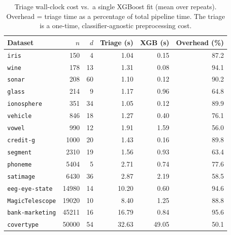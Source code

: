 \begin{table}[t]
\centering
\caption{Triage wall-clock cost vs.\ a single XGBoost fit (mean over repeats). Overhead = triage time as a percentage of total pipeline time. The triage is a one-time, classifier-agnostic preprocessing cost.}
\label{tab:cost}
\begin{tabular}{lrrrrr}
\toprule
Dataset & $n$ & $d$ & Triage (s) & XGB (s) & Overhead (\%) \\
\midrule
\texttt{iris} & 150 & 4 & 1.04 & 0.15 & 87.2 \\
\texttt{wine} & 178 & 13 & 1.31 & 0.08 & 94.1 \\
\texttt{sonar} & 208 & 60 & 1.10 & 0.12 & 90.2 \\
\texttt{glass} & 214 & 9 & 1.17 & 0.96 & 64.8 \\
\texttt{ionosphere} & 351 & 34 & 1.05 & 0.12 & 89.9 \\
\texttt{vehicle} & 846 & 18 & 1.27 & 0.40 & 76.1 \\
\texttt{vowel} & 990 & 12 & 1.91 & 1.59 & 56.0 \\
\texttt{credit-g} & 1000 & 20 & 1.43 & 0.16 & 89.8 \\
\texttt{segment} & 2310 & 19 & 1.56 & 0.93 & 63.4 \\
\texttt{phoneme} & 5404 & 5 & 2.71 & 0.74 & 77.6 \\
\texttt{satimage} & 6430 & 36 & 2.87 & 2.19 & 58.5 \\
\texttt{eeg-eye-state} & 14980 & 14 & 10.20 & 0.60 & 94.6 \\
\texttt{MagicTelescope} & 19020 & 10 & 8.40 & 1.25 & 88.8 \\
\texttt{bank-marketing} & 45211 & 16 & 16.79 & 0.84 & 95.6 \\
\texttt{covertype} & 50000 & 54 & 32.63 & 49.05 & 50.1 \\
\bottomrule
\end{tabular}
\end{table}
